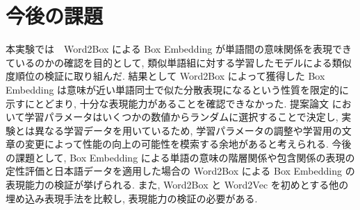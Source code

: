 \documentclass[twocolumn]{jarticle}     %
\begin{document}
\section{今後の課題}
本実験では　Word2Box による Box Embedding が単語間の意味関係を表現できているのかの確認を目的として, 類似単語組に対する学習したモデルによる類似度順位の検証に取り組んだ. 
結果として Word2Box によって獲得した Box Embedding は意味が近い単語同士で似た分散表現になるという性質を限定的に示すにとどまり, 十分な表現能力があることを確認できなかった. 
提案論文 \cite{dasgupta-etal-2022-word2box} において学習パラメータはいくつかの数値からランダムに選択することで決定し, 実験とは異なる学習データを用いているため, 学習パラメータの調整や学習用の文章の変更によって性能の向上の可能性を模索する余地があると考えられる. 
今後の課題として, Box Embedding による単語の意味の階層関係や包含関係の表現の定性評価と日本語データを適用した場合の Word2Box による Box Embedding の表現能力の検証が挙げられる. 
また, Word2Box と Word2Vec を初めとする他の埋め込み表現手法を比較し, 表現能力の検証の必要がある. 

\end{document}

